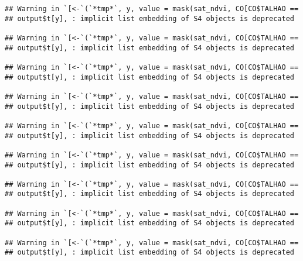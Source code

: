 \documentclass[
]{article}
\newenvironment{Shaded}{\begin{snugshade}}{\end{snugshade}}
\newcommand{\ControlFlowTok}[1]{\textcolor[rgb]{0.13,0.29,0.53}{\textbf{#1}}}
\newcommand{\DecValTok}[1]{\textcolor[rgb]{0.00,0.00,0.81}{#1}}
\newcommand{\FunctionTok}[1]{\textcolor[rgb]{0.00,0.00,0.00}{#1}}
\newcommand{\NormalTok}[1]{#1}
\newcommand{\OtherTok}[1]{\textcolor[rgb]{0.56,0.35,0.01}{#1}}
\newcommand{\SpecialCharTok}[1]{\textcolor[rgb]{0.00,0.00,0.00}{#1}}
\newcommand{\StringTok}[1]{\textcolor[rgb]{0.31,0.60,0.02}{#1}}
\begin{document}
\begin{Shaded}
\end{Shaded}

\begin{verbatim}
## Warning in `[<-`(`*tmp*`, y, value = mask(sat_ndvi, CO[CO$TALHAO ==
## output$t[y], : implicit list embedding of S4 objects is deprecated

## Warning in `[<-`(`*tmp*`, y, value = mask(sat_ndvi, CO[CO$TALHAO ==
## output$t[y], : implicit list embedding of S4 objects is deprecated

## Warning in `[<-`(`*tmp*`, y, value = mask(sat_ndvi, CO[CO$TALHAO ==
## output$t[y], : implicit list embedding of S4 objects is deprecated

## Warning in `[<-`(`*tmp*`, y, value = mask(sat_ndvi, CO[CO$TALHAO ==
## output$t[y], : implicit list embedding of S4 objects is deprecated

## Warning in `[<-`(`*tmp*`, y, value = mask(sat_ndvi, CO[CO$TALHAO ==
## output$t[y], : implicit list embedding of S4 objects is deprecated

## Warning in `[<-`(`*tmp*`, y, value = mask(sat_ndvi, CO[CO$TALHAO ==
## output$t[y], : implicit list embedding of S4 objects is deprecated

## Warning in `[<-`(`*tmp*`, y, value = mask(sat_ndvi, CO[CO$TALHAO ==
## output$t[y], : implicit list embedding of S4 objects is deprecated

## Warning in `[<-`(`*tmp*`, y, value = mask(sat_ndvi, CO[CO$TALHAO ==
## output$t[y], : implicit list embedding of S4 objects is deprecated

## Warning in `[<-`(`*tmp*`, y, value = mask(sat_ndvi, CO[CO$TALHAO ==
## output$t[y], : implicit list embedding of S4 objects is deprecated
\end{verbatim}

\begin{Shaded}
\end{Shaded}
\end{document}
